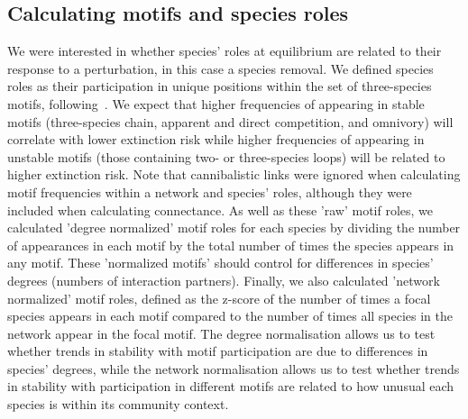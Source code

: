 \documentclass[12pt]{article}
\begin{document}
	\subsection*{Calculating motifs and species roles}

		We were interested in whether species' roles at equilibrium are related to their response to a perturbation, in this case a species removal. We defined species roles as their participation in unique positions within the set of three-species motifs, following~\citet{Stouffer2012,Cirtwill2015}. We expect that higher frequencies of appearing in stable motifs (three-species chain, apparent and direct competition, and omnivory) will correlate with lower extinction risk while higher frequencies of appearing in unstable motifs (those containing two- or three-species loops) will be related to higher extinction risk.	Note that cannibalistic links were ignored when calculating motif frequencies within a network and species' roles, although they were included when calculating connectance. As well as these 'raw' motif roles, we calculated 'degree normalized' motif roles for each species by dividing the number of appearances in each motif by the total number of times the species appears in any motif. These 'normalized motifs' should control for differences in species' degrees (numbers of interaction partners). Finally, we also calculated 'network normalized' motif roles, defined as the z-score of the number of times a focal species appears in each motif compared to the number of times all species in the network appear in the focal motif.
		The degree normalisation allows us to test whether trends in stability with motif participation are due to differences in species' degrees, while the network normalisation allows us to test whether trends in stability with participation in different motifs are related to how unusual each species is within its community context.


\end{document}
